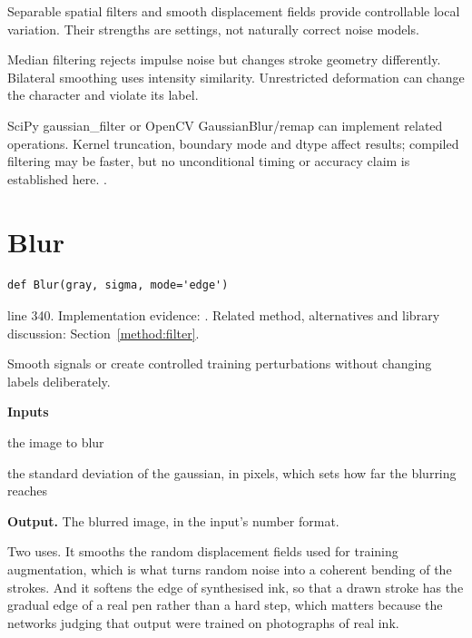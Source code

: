 Separable spatial filters and smooth displacement fields provide controllable local variation. Their strengths are settings, not naturally correct noise models.


Median filtering rejects impulse noise but changes stroke geometry differently. Bilateral smoothing uses intensity similarity. Unrestricted deformation can change the character and violate its label.


SciPy gaussian\_filter or OpenCV GaussianBlur/remap can implement related operations. Kernel truncation, boundary mode and dtype affect results; compiled filtering may be faster, but no unconditional timing or accuracy claim is established here. \cite{simard2003,scipygaussian,opencvtransform}.


\section{Blur}\label{fn:segment:Blur}
\begin{lstlisting}[style=sig]
def Blur(gray, sigma, mode='edge')
\end{lstlisting}
 line 340. Implementation evidence: \cite{code2026}. Related method, alternatives and library discussion: Section~\ref{method:filter}.


Smooth signals or create controlled training perturbations without changing labels deliberately.




\noindent\textbf{Inputs}
\begin{description}[leftmargin=2.2em,style=nextline,font=\normalfont\ttfamily]\setlength\itemsep{1pt}
  \item[{img}] \normalfont the image to blur
  \item[{sigma}] \normalfont the standard deviation of the gaussian, in pixels, which sets how far the blurring reaches
\end{description}

\noindent\textbf{Output.} The blurred image, in the input's number format.


Two uses. It smooths the random displacement fields used for training augmentation, which is what turns random noise into a coherent bending of the strokes. And it softens the edge of synthesised ink, so that a drawn stroke has the gradual edge of a real pen rather than a hard step, which matters because the networks judging that output were trained on photographs of real ink.


